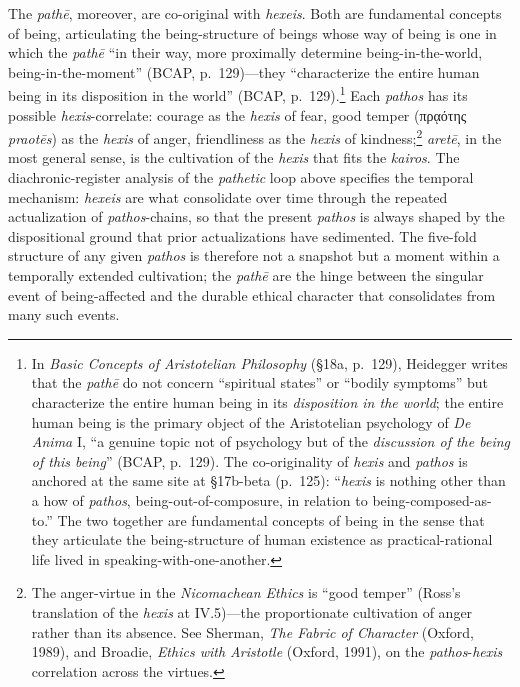 \documentclass{article}
\newcommand{\gk}[1]{{\greekfont #1}}
\begin{document}
The \textit{pathē}, moreover, are co-original with \textit{hexeis}. Both are fundamental concepts of being, articulating the being-structure of beings whose way of being is one in which the \textit{pathē} ``in their way, more proximally determine being-in-the-world, being-in-the-moment'' (BCAP, p.~129)---they ``characterize the entire human being in its disposition in the world'' (BCAP, p.~129).\footnote{In \textit{Basic Concepts of Aristotelian Philosophy} (\S 18a, p.~129), Heidegger writes that the \textit{pathē} do not concern ``spiritual states'' or ``bodily symptoms'' but characterize the entire human being in its \textit{disposition in the world}; the entire human being is the primary object of the Aristotelian psychology of \textit{De Anima} I, ``a genuine topic not of psychology but of the \textit{discussion of the being of this being}'' (BCAP, p.~129). The co-originality of \textit{hexis} and \textit{pathos} is anchored at the same site at \S 17b-beta (p.~125): ``\textit{hexis} is nothing other than a how of \textit{pathos}, being-out-of-composure, in relation to being-composed-as-to.'' The two together are fundamental concepts of being in the sense that they articulate the being-structure of human existence as practical-rational life lived in speaking-with-one-another.} Each \textit{pathos} has its possible \textit{hexis}-correlate: courage as the \textit{hexis} of fear, good temper (\gk{πρᾳότης} \textit{praotēs}) as the \textit{hexis} of anger, friendliness as the \textit{hexis} of kindness;\footnote{The anger-virtue in the \textit{Nicomachean Ethics} is ``good temper'' (Ross's translation of the \textit{hexis} at IV.5)---the proportionate cultivation of anger rather than its absence. See Sherman, \textit{The Fabric of Character} (Oxford, 1989), and Broadie, \textit{Ethics with Aristotle} (Oxford, 1991), on the \textit{pathos}-\textit{hexis} correlation across the virtues.} \textit{aretē}, in the most general sense, is the cultivation of the \textit{hexis} that fits the \textit{kairos}. The diachronic-register analysis of the \textit{pathetic} loop above specifies the temporal mechanism: \textit{hexeis} are what consolidate over time through the repeated actualization of \textit{pathos}-chains, so that the present \textit{pathos} is always shaped by the dispositional ground that prior actualizations have sedimented. The five-fold structure of any given \textit{pathos} is therefore not a snapshot but a moment within a temporally extended cultivation; the \textit{pathē} are the hinge between the singular event of being-affected and the durable ethical character that consolidates from many such events.
\end{document}
